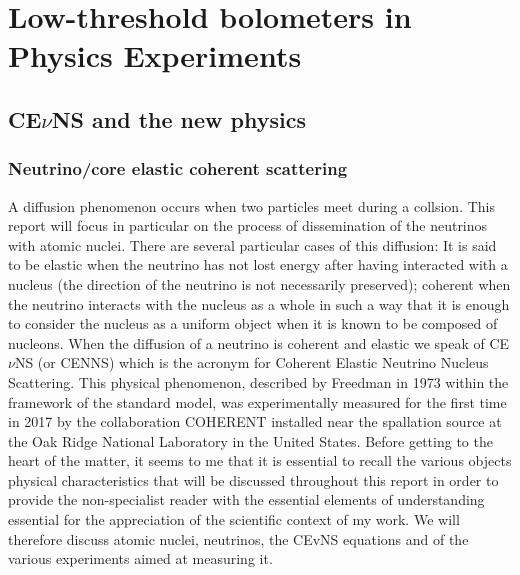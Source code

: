 
\chapter{Low-threshold bolometers in Physics Experiments} %

\label{ChapterIntro} %


\section{CE$\nu$NS and the new physics}

\subsection{Neutrino/core elastic coherent scattering}

A diffusion phenomenon occurs when two particles meet during a collsion. This report will focus in particular on the process of dissemination of the neutrinos with atomic nuclei. There are several particular cases of this diffusion: It is said to be elastic when the neutrino has not lost energy after having interacted with a nucleus (the direction of the neutrino is not necessarily preserved); coherent when the neutrino interacts with the nucleus as a whole in such a way that it is enough to consider the nucleus as a uniform object when it is known to be composed of nucleons. When the diffusion of a neutrino is coherent and elastic we speak of CE$\nu$NS (or CENNS) which is the acronym for Coherent Elastic Neutrino Nucleus Scattering. This physical phenomenon, described by Freedman in 1973 within the framework of the standard model, was experimentally measured for the first time in 2017 by the collaboration COHERENT installed near the spallation source at the Oak Ridge National Laboratory in the United States.
Before getting to the heart of the matter, it seems to me that it is essential to recall the various objects physical characteristics that will be discussed throughout this report in order to provide the non-specialist reader with the essential elements of understanding essential for the appreciation of the scientific context of my work. We will therefore discuss atomic nuclei, neutrinos, the CEvNS equations and of the various experiments aimed at measuring it.


